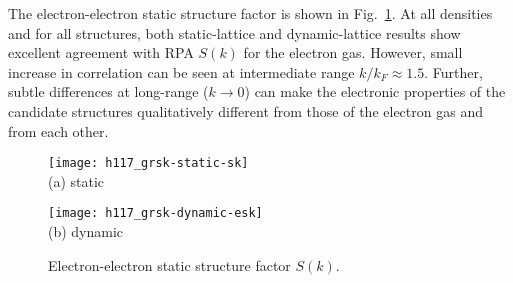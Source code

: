 \begin{comment}
The electron-ion pair correlation functions are shown in Fig.~\ref{fig:hsolid-epgr}.
They are shown separately for each candidate structure with pressure encoded in color.
For all candidate structures, the small-distance electron-proton correlation decrease as pressure increases.
As the kinetic energy becomes more important, the electrons delocalize more to lower kinetic energy, thus localize less around the protons.

\begin{figure}[h]
\centering
\begin{minipage}{0.49\textwidth}
\centering
\texttt{[image: h117ga\_dynamic-c2c-s2-ep]}\\
(a) C2/c-24
\end{minipage}
\begin{minipage}{0.49\textwidth}
\centering
\texttt{[image: h117ga\_dynamic-cmca12-s2-ep]}\\
(b) Cmca-12
\end{minipage}
\begin{minipage}{0.49\textwidth}
\centering
\texttt{[image: h117ga\_dynamic-cmca4-s2-ep]}\\
(c) Cmca-4
\end{minipage}
\begin{minipage}{0.49\textwidth}
\centering
\texttt{[image: h117ga\_dynamic-i41amd-s2-ep]}\\
(d) I4$_1$/amd
\end{minipage}
\caption{Dynamic-lattice electron-proton pair correlation function ep $g(r)$.}
\label{fig:hsolid-epgr}
\end{figure}
\end{comment}

The electron-electron static structure factor is shown in Fig.~\ref{fig:hsolid-esk}.
At all densities and for all structures, both static-lattice and dynamic-lattice results show excellent agreement with RPA $S(k)$ for the electron gas.
However, small increase in correlation can be seen at intermediate range $k/k_F\approx 1.5$.
Further, subtle differences at long-range ($k\rightarrow0$) can make the electronic properties of the candidate structures qualitatively different from those of the electron gas and from each other.

\begin{figure}[h]
\centering
\begin{minipage}{0.49\textwidth}
\centering
\texttt{[image: h117\_grsk-static-sk]}\\
(a) static
\end{minipage}
\begin{minipage}{0.49\textwidth}
\centering
\texttt{[image: h117\_grsk-dynamic-esk]}\\
(b) dynamic
\end{minipage}
\caption{Electron-electron static structure factor $S(k)$.}
\label{fig:hsolid-esk}
\end{figure}

